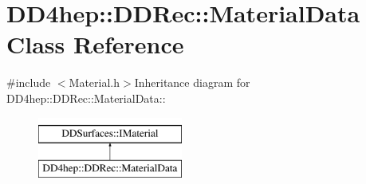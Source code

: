 \hypertarget{class_d_d4hep_1_1_d_d_rec_1_1_material_data}{
\section{DD4hep::DDRec::MaterialData Class Reference}
\label{class_d_d4hep_1_1_d_d_rec_1_1_material_data}
}


{\ttfamily \#include $<$Material.h$>$}Inheritance diagram for DD4hep::DDRec::MaterialData::\begin{figure}[H]
\begin{center}
\leavevmode
\includegraphics[height=2cm]{class_d_d4hep_1_1_d_d_rec_1_1_material_data}
\end{center}
\end{figure}

